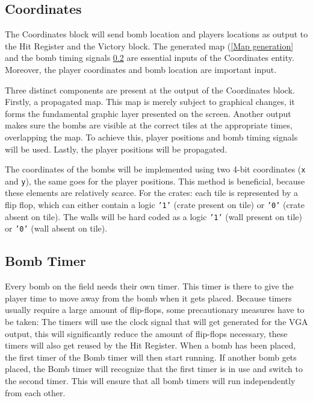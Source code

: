 \subsection{Coordinates}\label{Coordinates}
The Coordinates block will send bomb location and players locations as output to the Hit Register and the Victory block. The generated map (\ref{Map generation} and the bomb timing signals \ref{BombTimer} are essential inputs of the Coordinates entity. Moreover, the player coordinates and bomb location are  important input.

Three distinct components are present at the output of the Coordinates block. Firstly, a propagated map. This map is merely subject to graphical changes, it forms the fundamental graphic layer presented on the screen. Another output makes sure the bombs are visible at the correct tiles at the appropriate times, overlapping the map. To achieve this, player positions and bomb timing signals will be used. Lastly, the player positions will be propagated.


 
 The coordinates of the bombs will be implemented using two 4-bit coordinates (\texttt{x} and \texttt{y}), the same goes for the player positions. This method is beneficial, because these elements are relatively scarce.
 For the crates: each tile is represented by a flip flop, which can either contain a logic \texttt{'1'} (crate present on tile) or \texttt{'0'} (crate absent on tile). The walls will be hard coded as a logic \texttt{'1'} (wall present on tile) or \texttt{'0'} (wall absent on tile).
 
 \subsection{Bomb Timer}\label{BombTimer}
 Every bomb on the field needs their own timer. This timer is there to give the player time to move away from the bomb when it gets placed. Because timers usually require a large amount of flip-flops, some precautionary measures have to be taken: The timers will use the clock signal that will get generated for the VGA output, this will significantly reduce the amount of flip-flops necessary, these timers will also get reused by the Hit Register. When a bomb has been placed, the first timer of the Bomb timer will then start running. If another bomb gets placed, the Bomb timer will recognize that the first timer is in use and switch to the second timer. This will ensure that all bomb timers will run independently from each other.
 
